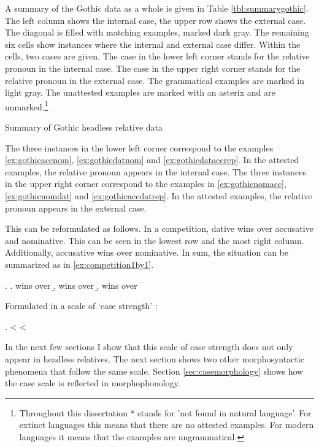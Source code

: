 A summary of the Gothic data as a whole is given in Table \ref{tbl:summarygothic}. The left column shows the internal case, the upper row shows the external case. The diagonal is filled with matching examples, marked dark gray.
The remaining six cells show instances where the internal and external case differ. Within the cells, two cases are given. The case in the lower left corner stands for the relative pronoun in the internal case. The case in the upper right corner stands for the relative pronoun in the external case. The grammatical examples are marked in light gray. The unattested examples are marked with an asterix and are unmarked.\footnote{
Throughout this dissertation * stands for 'not found in natural language'. For extinct languages this means that there are no attested examples. For modern languages it means that the examples are ungrammatical.
}

\begin{table}[H]
  \center
  \caption {Summary of Gothic headless relative data}
    
    \label{tbl:summarygothic}
\end{table}

The three instances in the lower left corner correspond to the examples \ref{ex:gothicaccnom}, \ref{ex:gothicdatnom} and \ref{ex:gothicdataccrep}. In the attested examples, the relative pronoun appears in the internal case.
The three instances in the upper right corner correspond to the examples in \ref{ex:gothicnomacc}, \ref{ex:gothicnomdat} and \ref{ex:gothicaccdatrep}. In the attested examples, the relative pronoun appears in the external case.

This can be reformulated as follows. In a competition, dative wins over accusative and nominative. This can be seen in the lowest row and the most right column. Additionally, accusative wins over nominative. In sum, the situation can be summarized as in \ref{ex:competition1by1}.

\ex.\label{ex:competition1by1}
\a.  wins over 
\b.  wins over 
\b.  wins over 

Formulated in a scale of `case strength' \citealt{harbert1978,pittner1995,vogel2001,grosu2003,caha2019}:

\ex.  <  < \label{ex:casestrength}

In the next few sections I show that this scale of case strength does not only appear in headless relatives. The next section shows two other morphosyntactic phenomena that follow the same scale. Section \ref{sec:casemorphology} shows how the case scale is reflected in morphophonology.


